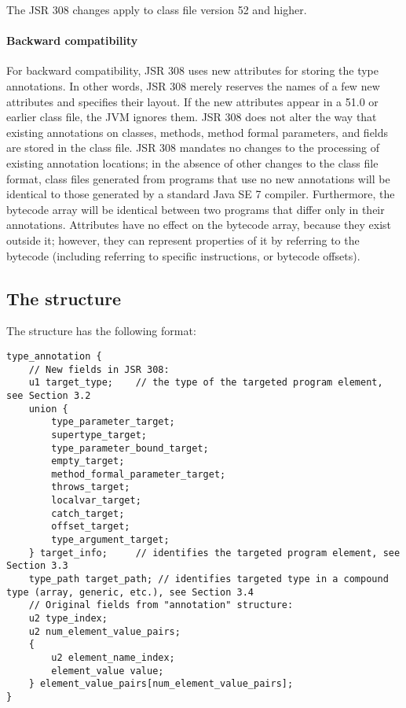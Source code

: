 \documentclass[10pt]{article}
\newcommand{\preverbnegspace}{\vspace{-5pt}}
\begin{document}

The JSR 308 changes apply to class file version 52 and higher.


\paragraph{Backward compatibility}
For backward compatibility, JSR 308 uses new attributes for storing
the type annotations.  In other words, JSR 308 merely reserves the
names of a few new attributes and specifies their layout.
If the new attributes appear in a 51.0 or earlier
class file, the JVM ignores them.
JSR 308 does
not alter the way that existing annotations on classes, methods, method formal parameters,
and fields are stored in the class file.
JSR 308 mandates no changes to the processing of existing annotation locations;
in the absence of other changes to the class file format,
class files generated from programs that use no new
annotations will be identical to those generated by a standard Java SE 7
compiler.
Furthermore, the bytecode array will be identical between two programs that
differ only in their annotations.
Attributes have no effect on the bytecode array, because they exist outside
it; however, they can represent properties of it by referring to the
bytecode (including referring to specific instructions, or bytecode offsets).


\subsection{The  structure\label{class-file:ext}}

The \extendedannotation structure has the following format:

\preverbnegspace
\begin{Verbatim}
type_annotation {
    // New fields in JSR 308:
    u1 target_type;    // the type of the targeted program element, see Section 3.2
    union {
        type_parameter_target;
        supertype_target;
        type_parameter_bound_target;
        empty_target;
        method_formal_parameter_target;
        throws_target;
        localvar_target;
        catch_target;
        offset_target;
        type_argument_target;
    } target_info;     // identifies the targeted program element, see Section 3.3
    type_path target_path; // identifies targeted type in a compound type (array, generic, etc.), see Section 3.4
    // Original fields from "annotation" structure:
    u2 type_index;
    u2 num_element_value_pairs;
    {
        u2 element_name_index;
        element_value value;
    } element_value_pairs[num_element_value_pairs];
}
\end{Verbatim}
\end{document}
